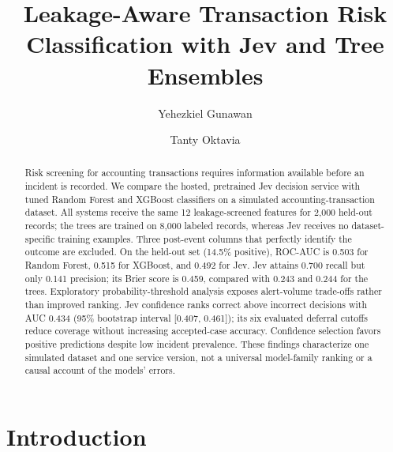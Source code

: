 \documentclass{llncs}
\begin{document}
\title{Leakage-Aware Transaction Risk Classification with Jev and Tree Ensembles}
\author{Yehezkiel Gunawan \and Tanty Oktavia}
\maketitle

\begin{abstract}
Risk screening for accounting transactions requires information available before an incident is recorded. We compare the hosted, pretrained Jev decision service with tuned Random Forest and XGBoost classifiers on a simulated accounting-transaction dataset. All systems receive the same 12 leakage-screened features for 2,000 held-out records; the trees are trained on 8,000 labeled records, whereas Jev receives no dataset-specific training examples. Three post-event columns that perfectly identify the outcome are excluded. On the held-out set (14.5\% positive), ROC-AUC is 0.503 for Random Forest, 0.515 for XGBoost, and 0.492 for Jev. Jev attains 0.700 recall but only 0.141 precision; its Brier score is 0.459, compared with 0.243 and 0.244 for the trees. Exploratory probability-threshold analysis exposes alert-volume trade-offs rather than improved ranking. Jev confidence ranks correct above incorrect decisions with AUC 0.434 (95\% bootstrap interval [0.407, 0.461]); its six evaluated deferral cutoffs reduce coverage without increasing accepted-case accuracy. Confidence selection favors positive predictions despite low incident prevalence. These findings characterize one simulated dataset and one service version, not a universal model-family ranking or a causal account of the models' errors.

\end{abstract}

\section{Introduction}
\end{document}
